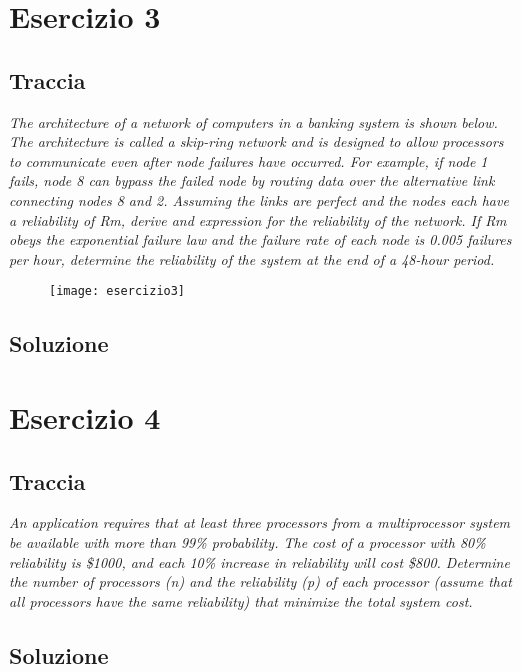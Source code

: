 \clearpage

\section{Esercizio 3}
\subsection{Traccia}
\textit{The architecture of a network of computers in a banking system is shown
below. The architecture is called a skip-ring network and is designed to allow
processors to communicate even after node failures have occurred. For example,
if node 1 fails, node 8 can bypass the failed node by routing data over the
alternative link connecting nodes 8 and 2. Assuming the links are perfect and
the nodes each have a reliability of Rm, derive and expression for the reliability
of the network. If Rm obeys the exponential failure law and the failure rate of
each node is 0.005 failures per hour, determine the reliability of the system
at the end of a 48-hour period.}
\begin{figure}[!htbp]
  \centering
  \texttt{[image: esercizio3]}
\end{figure}

\clearpage
\subsection{Soluzione}

\clearpage
\section{Esercizio 4}
\subsection{Traccia}
\textit{An application requires that at least three processors from a multiprocessor
system be available with more than 99\% probability. The cost of a processor with
80\% reliability is \$1000, and each 10\% increase in reliability will cost \$800.
Determine the number of processors (n) and the reliability (p) of each processor
(assume that all processors have the same reliability) that minimize the total
system cost.}

\clearpage
\subsection{Soluzione}

